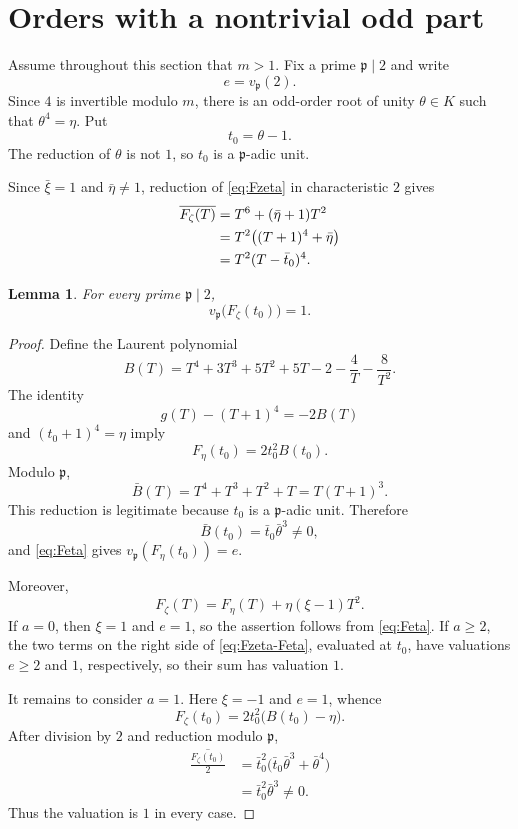 \documentclass[11pt]{article}
\newtheorem{lemma}[theorem]{Lemma}
\begin{document}
\section{Orders with a nontrivial odd part}
\label{sec:odd-part-base}

Assume throughout this section that $m>1$.  Fix a prime
$\mathfrak p\mid2$ and write
\[
 e=v_{\mathfrak p}(2).
\]
Since $4$ is invertible modulo $m$, there is an odd-order root of unity
$\theta\in K$ such that $\theta^4=\eta$.  Put
\[
 t_0=\theta-1.
\]
The reduction of $\theta$ is not $1$, so $t_0$ is a
$\mathfrak p$-adic unit.

Since $\bar\xi=1$ and $\bar\eta\neq1$, reduction of
\eqref{eq:Fzeta} in characteristic $2$ gives
\begin{align}
 \overline{F_\zeta(T)}
 &=T^6+(\bar\eta+1)T^2 \notag\\
 &=T^2\bigl((T+1)^4+\bar\eta\bigr) \notag\\
 &=T^2(T-\bar t_0)^4.
 \label{eq:odd-reduction}
\end{align}

\begin{lemma}\label{lem:t0-valuation}
For every prime $\mathfrak p\mid2$,
\[
 v_{\mathfrak p}\bigl(F_\zeta(t_0)\bigr)=1.
\]
\end{lemma}

\begin{proof}
Define the Laurent polynomial
\[
 B(T)=T^4+3T^3+5T^2+5T-2-\frac4T-\frac8{T^2}.
\]
The identity
\[
 g(T)-(T+1)^4=-2B(T)
\]
and $(t_0+1)^4=\eta$ imply
\begin{equation}\label{eq:Feta}
 F_\eta(t_0)=2t_0^2B(t_0).
\end{equation}
Modulo $\mathfrak p$,
\[
 \bar B(T)=T^4+T^3+T^2+T=T(T+1)^3.
\]
This reduction is legitimate because $t_0$ is a $\mathfrak p$-adic
unit.  Therefore
\[
 \bar B(t_0)=\bar t_0\bar\theta^3\neq0,
\]
and \eqref{eq:Feta} gives
$v_{\mathfrak p}(F_\eta(t_0))=e$.

Moreover,
\begin{equation}\label{eq:Fzeta-Feta}
 F_\zeta(T)=F_\eta(T)+\eta(\xi-1)T^2.
\end{equation}
If $a=0$, then $\xi=1$ and $e=1$, so the assertion follows from
\eqref{eq:Feta}.  If $a\geq2$, the two terms on the right side of
\eqref{eq:Fzeta-Feta}, evaluated at $t_0$, have valuations $e\geq2$ and
$1$, respectively, so their sum has valuation $1$.

It remains to consider $a=1$.  Here $\xi=-1$ and $e=1$, whence
\[
 F_\zeta(t_0)=2t_0^2\bigl(B(t_0)-\eta\bigr).
\]
After division by $2$ and reduction modulo $\mathfrak p$,
\begin{align*}
 \overline{\frac{F_\zeta(t_0)}2}
 &=\bar t_0^2
   \bigl(\bar t_0\bar\theta^3+\bar\theta^4\bigr)\\
 &=\bar t_0^2\bar\theta^3\neq0.
\end{align*}
Thus the valuation is $1$ in every case.
\end{proof}
\end{document}
